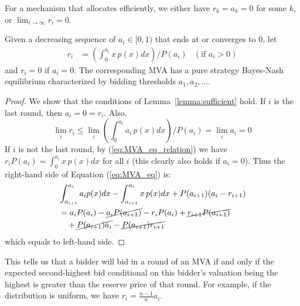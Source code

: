 
For a mechanism that allocates efficiently, we either have $r_k = a_k = 0$
for some $k$, or $\lim_{i \rightarrow \infty} r_i = 0$.

\begin{theorem}
Given a decreasing sequence of $a_i \in [0,1)$ that ends at or converges to
$0$, let
\begin{align}\label{eq:MVA_eq_relation}
  r_i &= \left( \int_{0}^{a_i} x \, p(x) dx \right) / P(a_i) & (\mbox{if $a_i > 0$})
\end{align}
and $r_i=0$ if $a_i=0$. The corresponding MVA has a pure strategy Bayes-Nash equilibrium characterized by
bidding thresholds $a_1, a_2, \ldots$.
\end{theorem}

\begin{proof}
We show that the conditions of Lemma~\ref{lemma:sufficient} hold.  If $i$
is the last round, then $a_i=0=r_i$.  Also, $$\lim_i r_i \leq \lim_i
\left( \int_{0}^{a_i} a_i \, p(x) dx \right) / P(a_i) = \lim_i a_i = 0$$
If $i$ is not the last round, 
by (\ref{eq:MVA_eq_relation}) we have $r_i P(a_i) = \int_{0}^{a_i}
x\,p(x)dx$ for all $i$ (this clearly also holds if
$a_i = 0$). Thus the right-hand side of Equation (\ref{eq:MVA_eq}) is:
\begin{align*}
	& \int_{a_{i+1}}^{a_i} a_i p(x) dx - \int_{a_{i+1}}^{a_i} x \, p(x) dx + P(a_{i+1})(a_i-r_{i+1}) \\
	&= a_i P(a_i) - \cancel{a_i P(a_{i+1})} - r_i P(a_i) + \cancel{r_{i+1} P(a_{i+1})} \\
		& ~~~ + \cancel{P(a_{i+1}) a_i} - \cancel{P(a_{i+1}) r_{i+1}}
\end{align*}
which equals to left-hand side.
\end{proof}

This tells us that a bidder will bid in a round of an MVA if and only if
the expected second-highest bid conditional on this bidder's valuation
being the highest is greater than the reserve price of that round. For
example, if the distribution is uniform, we have $r_i = \frac{n-1}{n}
a_i$. 

